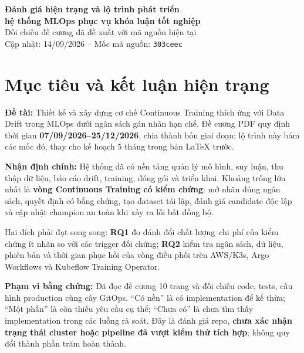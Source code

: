 \documentclass[11pt,a4paper]{article}
\begin{document}
\begin{center}
  \textbf{\Large Đánh giá hiện trạng và lộ trình phát triển\\hệ thống MLOps phục vụ khóa luận tốt nghiệp}\\[0.4em]
  Đối chiếu đề cương đã đề xuất với mã nguồn hiện tại\\
  {\small Cập nhật: 14/09/2026 -- Mốc mã nguồn: \texttt{303ceec}}
\end{center}

\section{Mục tiêu và kết luận hiện trạng}
\textbf{Đề tài:} Thiết kế và xây dựng cơ chế Continuous Training thích ứng với Data Drift trong MLOps dưới ngân sách gán nhãn hạn chế. Đề cương PDF quy định thời gian \textbf{07/09/2026--25/12/2026}, chia thành bốn giai đoạn; lộ trình này bám các mốc đó, thay cho kế hoạch 5 tháng trong bản LaTeX trước.

\textbf{Nhận định chính:} Hệ thống đã có nền tảng quản lý mô hình, suy luận, thu thập dữ liệu, báo cáo drift, training, đóng gói và triển khai. Khoảng trống lớn nhất là \textbf{vòng Continuous Training có kiểm chứng}: mở nhãn đúng ngân sách, quyết định có bằng chứng, tạo dataset tái lập, đánh giá candidate độc lập và cập nhật champion an toàn khi xảy ra lỗi bất đồng bộ.

Hai đích phải đạt song song: \textbf{RQ1} đo đánh đổi chất lượng--chi phí của kiểm chứng ít nhãn so với các trigger đối chứng; \textbf{RQ2} kiểm tra ngân sách, dữ liệu, phiên bản và thời gian phục hồi của vòng điều phối trên AWS/K3s, Argo Workflows và Kubeflow Training Operator.

\textbf{Phạm vi bằng chứng:} Đã đọc đề cương 10 trang và đối chiếu code, tests, cấu hình production cùng cây GitOps. ``Có nền'' là có implementation để kế thừa; ``Một phần'' là còn thiếu yêu cầu cụ thể; ``Chưa có'' là chưa tìm thấy implementation trong các luồng rà soát. Đây là đánh giá repo, \textbf{chưa xác nhận trạng thái cluster hoặc pipeline đã vượt kiểm thử tích hợp}; không quy đổi thành phần trăm hoàn thành.
\end{document}

